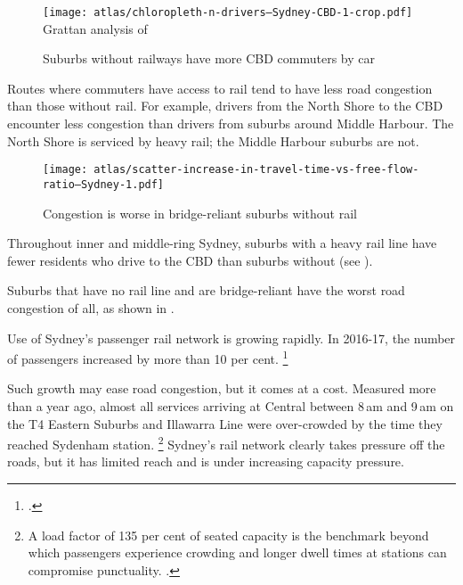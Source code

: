 \documentclass{grattan}
\begin{document}
\begin{figure*}
\caption{Suburbs without railways have more CBD commuters by car}\label{fig:above-below-average-n-drivers--InnerSydney}
\texttt{[image: atlas/chloropleth-n-drivers--Sydney-CBD-1-crop.pdf]}
%
{Grattan analysis of \textcite{ABS2011Census}}
\end{figure*}

Routes where commuters have access to rail tend to have less road congestion than those without rail.
For example, drivers from the North Shore to the CBD encounter less congestion than drivers from suburbs around Middle Harbour.
The North Shore is serviced by heavy rail; the Middle Harbour suburbs are not.

\begin{figure}
\caption{Congestion is worse in bridge-reliant suburbs without rail}\label{fig:railways-and-bridges-have-worst-congestion}
\texttt{[image: atlas/scatter-increase-in-travel-time-vs-free-flow-ratio--Sydney-1.pdf]}
\end{figure}

Throughout inner and middle-ring Sydney, suburbs with a heavy rail line have fewer residents who drive to the CBD than suburbs without (see ).

Suburbs that have no rail line and are bridge-reliant have the worst road congestion of all, as shown in .

Use of Sydney's passenger rail network is growing rapidly.
In 2016-17, the number of passengers increased by more than 10 per cent.%
\footcite{TrNSW-2017-MonthlyTransportPatronage}

Such growth may ease road congestion, but it comes at a cost. Measured more than a year ago, almost all services arriving at Central between 8\,am and 9\,am on the T4 Eastern Suburbs and Illawarra Line were over-crowded by the time they reached Sydenham station.%
    \footnote{A load factor of 135 per cent of seated capacity is the benchmark beyond which passengers experience crowding and longer dwell times at stations can compromise punctuality. \textcite[][March~2016]{TrNSW-2017-TrainLoadsByLine}.}
Sydney's rail network clearly takes pressure off the roads, but it has limited reach and is under increasing capacity pressure.
\end{document}
